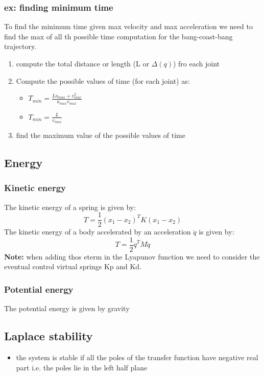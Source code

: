 \documentclass[a4paper,12pt]{article}
\begin{document}
\subsubsection{ex: finding minimum time}
To find the minimum time given max velocity and max acceleration we need to find the max 
of all th possible time computation for the bang-coast-bang trajectory.
\begin{enumerate}
    \item compute the total distance or length (L or $\Delta(q)$) fro each joint
    \item Compute the possible values of time (for each joint) as: \begin{itemize}
        \item $
            T_{min} = \frac{La_{max}+v^2_{max}}{a_{max}v_{max}}$
        \item $
            T_{min} = \frac{L}{v_{max}}$
    \end{itemize}
    \item find the maximum value of the possible values of time
\end{enumerate}
\subsection{Energy}
\subsubsection{Kinetic energy}
The kinetic energy of a spring is given by:
\begin{equation}
    T = \frac{1}{2} (x_1-x_2)^T K (x_1-x_2)
\end{equation}
The kinetic energy of a body accelerated by an acceleration $\ddot{q}$
is given by:
\begin{equation}
    T = \frac{1}{2} \dot{q}^T M \dot{q}
\end{equation}
\textbf{Note:} when adding thos eterm in 
the Lyapunov function we need to consider the
eventual control virtual springs Kp and Kd.

\subsubsection{Potential energy}
The potential energy is given by gravity

\subsection{Laplace stability}
\begin{itemize}
    \item the system is stable if all the poles of the 
    transfer function have negative real part i.e. the poles lie in the 
    left half plane
\end{itemize}
\end{document}
